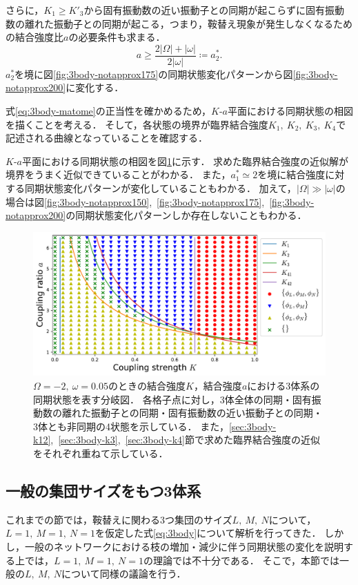 \documentclass[../main]{subfiles}
\begin{document}
    さらに，$K_1\geq K'_3$から固有振動数の近い振動子との同期が起こらずに固有振動数の離れた振動子との同期が起こる，つまり，鞍替え現象が発生しなくなるための結合強度比$a$の必要条件も求まる．
    \begin{equation}
        \label{eq:a-ast2}
        a\geq \frac{2|\Omega|+|\omega|}{2|\omega|}\coloneqq a^\ast_2.    
    \end{equation}
    $a^\ast_2$を境に図\ref{fig:3body-notapprox175}の同期状態変化パターンから図\ref{fig:3body-notapprox200}に変化する．

    式\eqref{eq:3body-matome}の正当性を確かめるため，$K$-$a$平面における同期状態の相図を描くことを考える．
    そして，各状態の境界が臨界結合強度$K_1,\ K_2,\ K_3,\ K_4$で記述される曲線となっていることを確認する．

    $K$-$a$平面における同期状態の相図を図\ref{fig:3body-phase}に示す．
    求めた臨界結合強度の近似解が境界をうまく近似できていることがわかる．
    また，$a^\ast_1\simeq 2$を境に結合強度に対する同期状態変化パターンが変化していることもわかる．
    加えて，$|\Omega|\gg|\omega|$の場合は図\ref{fig:3body-notapprox150},\ \ref{fig:3body-notapprox175},\ \ref{fig:3body-notapprox200}の同期状態変化パターンしか存在しないこともわかる．
    
    \begin{figure}[tbp]
    \centering
    \includegraphics[width=135mm]{images/three-body-phase.pdf}
    \centering
    \caption{$\Omega=-2,\ \omega=0.05$のときの結合強度$K$，結合強度$a$における3体系の同期状態を表す分岐図．
    各格子点に対し，3体全体の同期・固有振動数の離れた振動子との同期・固有振動数の近い振動子との同期・3体とも非同期の4状態を示している．
    また，\ref{sec:3body-k12},\ \ref{sec:3body-k3},\ \ref{sec:3body-k4}節で求めた臨界結合強度の近似をそれぞれ重ねて示している．
    }
    \label{fig:3body-phase}
    \end{figure}

\subsection{一般の集団サイズをもつ3体系}
\label{sec:3body-general}
これまでの節では，鞍替えに関わる3つ集団のサイズ$L,\ M,\ N$について，$L=1,\ M=1,\ N=1$を仮定した式\eqref{eq:3body}について解析を行ってきた．
しかし，一般のネットワークにおける枝の増加・減少に伴う同期状態の変化を説明する上では，$L=1,\ M=1,\ N=1$の理論では不十分である．
そこで，本節では一般の$L,\ M,\ N$について同様の議論を行う．
\end{document}

